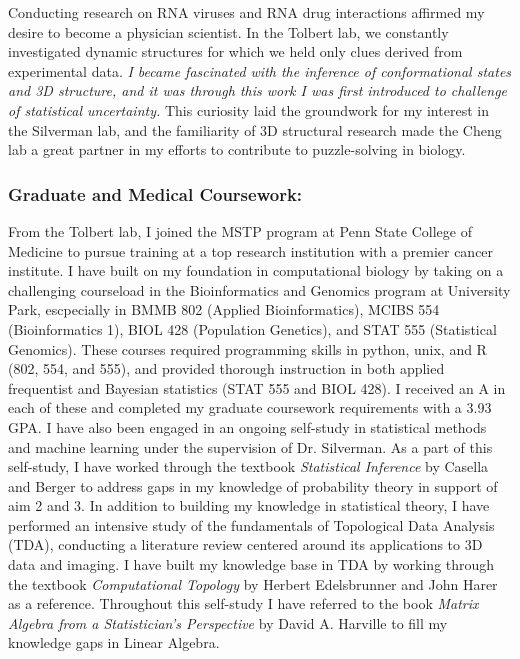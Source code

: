 \documentclass{NIHGrant}
\begin{document}
Conducting research on RNA viruses and RNA drug interactions affirmed my desire to become a physician scientist. In the Tolbert lab, we constantly investigated dynamic structures for which we held only clues derived from experimental data. \emph{I became fascinated with the inference of conformational states and 3D structure, and it was through this work I was first introduced to challenge of statistical uncertainty.} This curiosity laid the groundwork for my interest in the Silverman lab, and the familiarity of 3D structural research made the Cheng lab a great partner in my efforts to contribute to puzzle-solving in biology.

\subsubsection*{Graduate and Medical Coursework:}
From the Tolbert lab, I joined the MSTP program at Penn State College of Medicine to pursue training at a top research institution with a premier cancer institute. I have built on my foundation in computational biology by taking on a challenging courseload in the Bioinformatics and Genomics program at University Park, escpecially in BMMB 802 (Applied Bioinformatics), MCIBS 554 (Bioinformatics 1), BIOL 428 (Population Genetics), and STAT 555 (Statistical Genomics). These courses required programming skills in python, unix, and R (802, 554, and 555), and provided thorough instruction in both applied frequentist and Bayesian statistics (STAT 555 and BIOL 428). I received an A in each of these and completed my graduate coursework requirements with a 3.93 GPA. I have also been engaged in an ongoing self-study in statistical methods and machine learning under the supervision of Dr. Silverman. As a part of this self-study, I have worked through the textbook \textit{Statistical Inference} by Casella and Berger to address gaps in my knowledge of probability theory in support of aim 2 and 3. In addition to building my knowledge in statistical theory, I have performed an intensive study of the fundamentals of Topological Data Analysis (TDA), conducting a literature review centered around its applications to 3D data and imaging. I have built my knowledge base in TDA by working through the textbook \textit{Computational Topology} by Herbert Edelsbrunner and John Harer as a reference. Throughout this self-study I have referred to the book \textit{Matrix Algebra from a Statistician's Perspective} by David A. Harville to fill my knowledge gaps in Linear Algebra.
\end{document}
